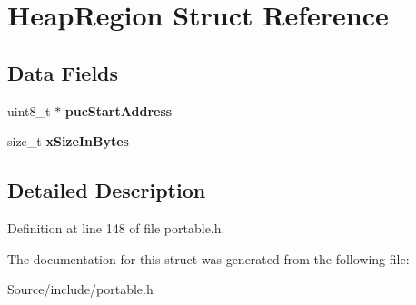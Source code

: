 \hypertarget{struct_heap_region}{}\section{Heap\+Region Struct Reference}
\label{struct_heap_region}
\subsection*{Data Fields}
\begin{DoxyCompactItemize}
\item 
\hypertarget{struct_heap_region_a9d602a97428bd849298f05391a13968e}{}uint8\+\_\+t $\ast$ {\bfseries puc\+Start\+Address}\label{struct_heap_region_a9d602a97428bd849298f05391a13968e}

\item 
\hypertarget{struct_heap_region_ab0ed41976d9901576b117bc7981f6c98}{}size\+\_\+t {\bfseries x\+Size\+In\+Bytes}\label{struct_heap_region_ab0ed41976d9901576b117bc7981f6c98}

\end{DoxyCompactItemize}


\subsection{Detailed Description}


Definition at line 148 of file portable.\+h.



The documentation for this struct was generated from the following file\+:\begin{DoxyCompactItemize}
\item 
Source/include/portable.\+h\end{DoxyCompactItemize}
